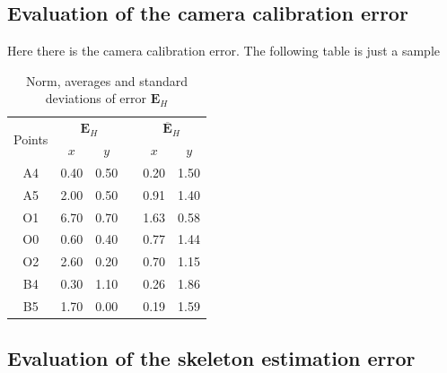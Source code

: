 \documentclass[a4paper, 10 pt, conference]{ieeeconf}      %
\begin{document}
\subsection{Evaluation of the camera calibration error}
Here there is the camera calibration error. The following table is just a sample

\begin{table}[h!]
	\centering
	\caption{Norm, averages and standard deviations of error $\mathbf{E}_H$}
	\label{tab:laser}
	\begin{adjustbox}{max width=\textwidth}
		\begin{tabular}{cccccc}
			\hline
			\multirow{2}{*}{Points} & \multicolumn{2}{c}{$\mathbf{E}_H$} &  & \multicolumn{2}{c}{$\overline{\mathbf{E}}_H$} \\ \cline{2-3} \cline{5-6} 
			& $x$                & $y$               &  & $x$                     & $y$                     \\ \hline
			A4                      & 0.40               & 0.50              &  & 0.20                    & 1.50                    \\
			A5                      & 2.00               & 0.50              &  & 0.91                    & 1.40                    \\
			O1                      & 6.70               & 0.70              &  & 1.63                    & 0.58                    \\
			O0                      & 0.60               & 0.40              &  & 0.77                    & 1.44                    \\
			O2                      & 2.60               & 0.20              &  & 0.70                    & 1.15                    \\
			B4                      & 0.30               & 1.10              &  & 0.26                    & 1.86                    \\
			B5                      & 1.70               & 0.00              &  & 0.19                    & 1.59                    \\ \hline
		\end{tabular}%
	\end{adjustbox}
\end{table}

\subsection{Evaluation of the skeleton estimation error}
\end{document}
